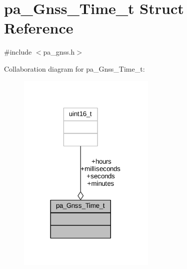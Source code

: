 \hypertarget{structpa___gnss___time__t}{}\section{pa\+\_\+\+Gnss\+\_\+\+Time\+\_\+t Struct Reference}
\label{structpa___gnss___time__t}


{\ttfamily \#include $<$pa\+\_\+gnss.\+h$>$}



Collaboration diagram for pa\+\_\+\+Gnss\+\_\+\+Time\+\_\+t\+:
\nopagebreak
\begin{figure}[H]
\begin{center}
\leavevmode
\includegraphics[width=186pt]{structpa___gnss___time__t__coll__graph}
\end{center}
\end{figure}
